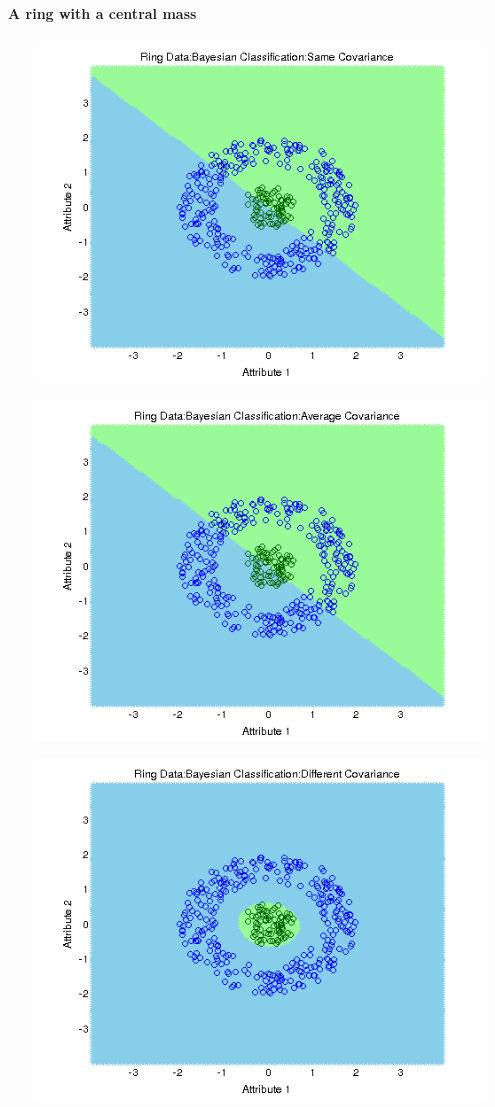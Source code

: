 \documentclass[a4paper]{article}
\begin{document}
			\paragraph{A ring with a central mass}
			
			\centerline{\includegraphics[width=160mm,height=90mm]{plots/bayes/nls/ring/same_cov.png}}
 			\centerline{\includegraphics[width=160mm,height=90mm]{plots/bayes/nls/ring/avg_cov.png}}
 			\centerline{\includegraphics[width=160mm,height=90mm]{plots/bayes/nls/ring/diff_cov.png}}
\end{document}
